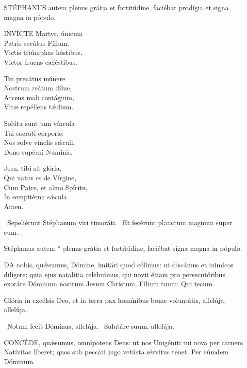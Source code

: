 
\lettrine[lines=2]{S}{TÉPHANUS} autem plenus grátia et fortitúdine, faciébat prodígia et signa magna in pópulo.


\lettrine[lines=2]{I}{NVÍCTE} Martyr, únicum\\
Patris secútus Fílium,\\
Victis triúmphas hóstibus,\\
Victor fruens cæléstibus.

Tui precátus múnere\\
Nostrum reátum dílue,\\
Arcens mali contágium,\\
Vitæ repéllens tǽdium.

Solúta sunt jam víncula\\
Tui sacráti córporis:\\
Nos solve vinclis sǽculi,\\
Dono supérni Núminis.

Jesu, tibi sit glória,\\
Qui natus es de Vírgine,\\
Cum Patre, et almo Spíritu,\\
In sempitérna sǽcula.\\
Amen.

\V\ Sepeliérunt Stéphanum viri timoráti. \R\ Et fecérunt planctum magnum super eum.

 Stéphanus autem * plenus grátia et fortitúdine, faciébat signa magna in pópulo.


\lettrine[lines=2]{D}{A} nobis, quǽsumus, Dómine, imitári quod cólimus: ut discámus et inimícos dilígere; quia ejus natalítia celebrámus, qui novit étiam pro persecutóribus exoráre Dóminum nostrum Jesum Christum, Fílium tuum: Qui tecum.


 Glória in excélsis Deo, et in terra pax homínibus bonæ voluntátis, allelúja, allelúja.

\V\ Notum fecit Dóminus, allelúja. \R\ Salutáre suum, allelúja.


\lettrine[lines=2]{C}{ONCÉDE}, quǽsumus, omnípotens Deus: ut nos Unigéniti tui nova per carnem Natívitas líberet; quos sub peccáti jugo vetústa sérvitus tenet. Per eúmdem Dóminum.

